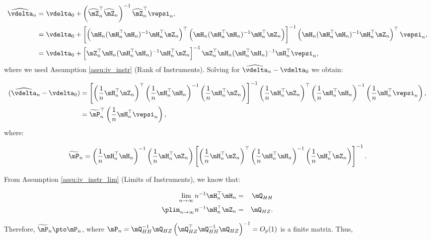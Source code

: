 \documentclass[english,12pt]{book}\usepackage[]{graphicx}\usepackage[]{xcolor}
\begin{document}
\begin{equation}\label{eq:sampling_error_s2sls}
  \begin{aligned}
     \widehat{\vdelta}_n & =  \vdelta_0 + \left(\widehat{\mZ}^\top_n\widehat{\mZ}_n\right)^{-1}\widehat{\mZ}^\top_n\vepsi_n, \\
     & = \vdelta_0 + \left[\left(\mH_n(\mH^\top_n\mH_n)^{-1}\mH^\top_n\mZ_n\right)^\top\left(\mH_n(\mH^\top_n\mH_n)^{-1}\mH^\top_n\mZ_n\right)\right]^{-1}\left(\mH_n(\mH^\top_n\mH_n)^{-1}\mH^\top_n\mZ_n\right)^\top\vepsi_n, \\
     & = \vdelta_0 + \left[\mZ^\top_n \mH_n (\mH^\top_n\mH_n)^{-1}\mH^\top_n\mZ_n\right]^{-1}\mZ^\top_n\mH_n(\mH^\top_n\mH_n)^{-1}\mH^\top_n\vepsi_n,
  \end{aligned}
\end{equation}
%
where we used Assumption \ref{assu:iv_instr} (Rank of Instruments).  Solving for $\widehat{\vdelta}_{n} - \vdelta_0$ we obtain:

\begin{equation}\label{eq:asy_2sls_pr}
\begin{aligned}
(\widehat{\vdelta}_{n} - \vdelta_0) & = \left[\left(\frac{1}{n}\mH^\top_n\mZ _n\right)^\top\left(\frac{1}{n}\mH^\top_n\mH_n\right)^{-1}\left(\frac{1}{n}\mH^\top_n\mZ_n\right)\right]^{-1}\left(\frac{1}{n}\mH^\top_n\mZ_n\right)^\top\left(\frac{1}{n}\mH^\top_n\mH_n\right)^{-1}\left(\frac{1}{n}\mH^\top_n\vepsi_n\right), \\
             & = \widetilde{\mP}^\top_n\left(\frac{1}{n}\mH^\top_n\vepsi_n\right),
\end{aligned}
\end{equation}
%
where:

\begin{equation*}
  \widetilde{\mP}_n = \left(\frac{1}{n}\mH^\top_n\mH_n\right)^{-1}\left(\frac{1}{n}\mH_n^\top\mZ_n \right)\left[\left(\frac{1}{n}\mH^\top_n\mZ_n\right)^\top\left(\frac{1}{n}\mH^\top_n\mH_n\right)^{-1}\left(\frac{1}{n}\mH^\top_n\mZ_n\right)\right]^{-1}.
\end{equation*}


From Assumption \ref{assu:iv_instr_lim} (Limits of Instruments), we know that:

\begin{eqnarray*}
\lim_{n\to \infty} n^{-1}\mH_n^\top\mH_n &=& \mQ_{HH}\\
\plim_{n\to \infty} n^{-1}\mH_n^\top\mZ_n &=& \mQ_{HZ}.
\end{eqnarray*}


Therefore,  $\widetilde{\mP}_n\pto \mP_n$, where $\mP_n=\mQ_{HH}^{-1}\mQ_{HZ}\left(\mQ_{HZ}^\top\mQ_{HH}^{-1}\mQ_{HZ}\right)^{-1}=O_p(1)$ is a finite matrix. Thus,
\end{document}
